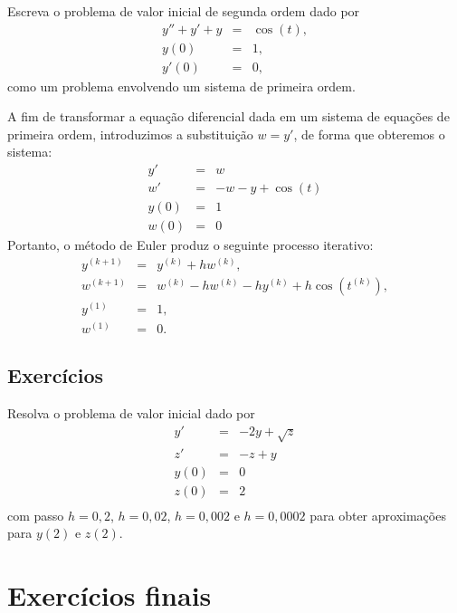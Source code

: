 \begin{ex} Escreva o problema de valor inicial de segunda ordem dado por
\begin{eqnarray*}
y''+y'+y&=&\cos(t),\\
y(0)&=&1,\\
y'(0)&=&0,
\end{eqnarray*}
como um problema envolvendo um sistema de primeira ordem.
\end{ex}
A fim de transformar a equação diferencial dada em um sistema de equações de primeira ordem, introduzimos a substituição $w=y'$, de forma que obteremos o sistema:
\begin{eqnarray*}
y'&=&w\\
w'&=&-w-y+\cos(t)\\
y(0)&=&1\\
w(0)&=&0
\end{eqnarray*}
Portanto, o método de Euler produz o seguinte processo iterativo:
\begin{eqnarray*}
y^{(k+1)}&=&y^{(k)}+hw^{(k)},\\
w^{(k+1)}&=&w^{(k)}-hw^{(k)}-hy^{(k)}+h\cos(t^{(k)}),\\
y^{(1)}&=&1,\\
w^{(1)}&=&0.
\end{eqnarray*}


\subsection*{Exercícios}

\begin{exer}Resolva o problema de valor inicial dado por
\begin{eqnarray*}
y'&=& -2y + \sqrt{z}\\
z'&=& -z + y\\
y(0)&=&0\\
z(0)&=&2\\
\end{eqnarray*}
com passo $h=0,2$, $h=0,02$, $h=0,002$ e $h=0,0002$ para obter aproximações para $y(2)$ e $z(2)$.
\end{exer}


\section{Exercícios finais}

